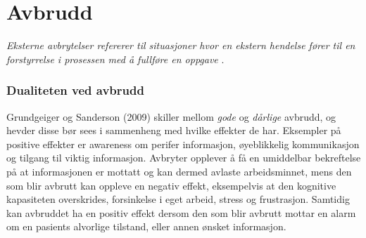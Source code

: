\section{Avbrudd}
\label{chp: avbrudd} 
\emph{Eksterne avbrytelser refererer til situasjoner hvor en ekstern hendelse fører til en forstyrrelse i prosessen med å fullføre en oppgave} \cite{Harr07}.

\subsubsection{Dualiteten ved avbrudd}
Grundgeiger og Sanderson (2009) \nocite{Grundgeiger09} skiller mellom \emph{gode} og \emph{dårlige} avbrudd, og hevder disse bør sees i sammenheng med hvilke effekter de har. Eksempler på positive effekter er awareness om perifer informasjon, øyeblikkelig kommunikasjon og tilgang til viktig informasjon. Avbryter opplever å få en umiddelbar bekreftelse på at informasjonen er mottatt og kan dermed avlaste arbeidsminnet, mens den som blir avbrutt kan oppleve en negativ effekt, eksempelvis at den kognitive kapasiteten overskrides, forsinkelse i eget arbeid, stress og frustrasjon. Samtidig kan avbruddet ha en positiv effekt dersom den som blir avbrutt mottar en alarm om en pasients alvorlige tilstand, eller annen ønsket informasjon.

